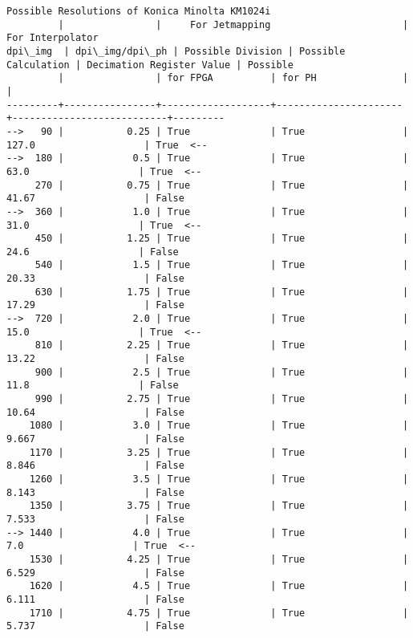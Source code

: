 \documentclass{article}
\begin{document}
    \begin{Verbatim}[commandchars=\\\{\}]
Possible Resolutions of Konica Minolta KM1024i
         |                |     For Jetmapping                       |      For Interpolator               
dpi\_img  | dpi\_img/dpi\_ph | Possible Division | Possible Calculation | Decimation Register Value | Possible
         |                | for FPGA          | for PH               |                           |         
---------+----------------+-------------------+----------------------+---------------------------+---------
-->   90 |           0.25 | True              | True                 |   127.0                   | True  <--
-->  180 |            0.5 | True              | True                 |    63.0                   | True  <--
     270 |           0.75 | True              | True                 |   41.67                   | False
-->  360 |            1.0 | True              | True                 |    31.0                   | True  <--
     450 |           1.25 | True              | True                 |    24.6                   | False
     540 |            1.5 | True              | True                 |   20.33                   | False
     630 |           1.75 | True              | True                 |   17.29                   | False
-->  720 |            2.0 | True              | True                 |    15.0                   | True  <--
     810 |           2.25 | True              | True                 |   13.22                   | False
     900 |            2.5 | True              | True                 |    11.8                   | False
     990 |           2.75 | True              | True                 |   10.64                   | False
    1080 |            3.0 | True              | True                 |   9.667                   | False
    1170 |           3.25 | True              | True                 |   8.846                   | False
    1260 |            3.5 | True              | True                 |   8.143                   | False
    1350 |           3.75 | True              | True                 |   7.533                   | False
--> 1440 |            4.0 | True              | True                 |     7.0                   | True  <--
    1530 |           4.25 | True              | True                 |   6.529                   | False
    1620 |            4.5 | True              | True                 |   6.111                   | False
    1710 |           4.75 | True              | True                 |   5.737                   | False

\end{Verbatim}
\end{document}

